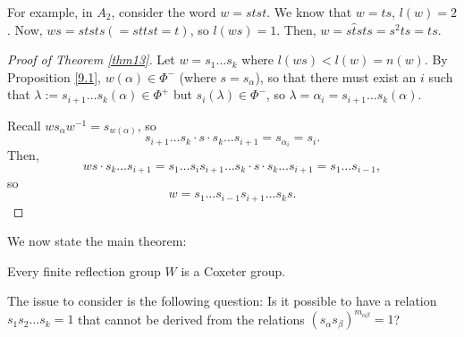 For example, in $A_2$, consider the word $w = stst$. We know that
$w = ts$, $l(w) = 2$. Now,
$ws = ststs (= sttst = t)$,
so $l(ws) = 1$. Then, $w = s \hat{t} sts = s^2 ts = ts$.

\begin{proof}[Proof of Theorem \ref{thm13}]
Let $w = s_1 \dots s_k$ where $l(ws) < l(w) = n(w)$. By Proposition \ref{9.1},
$w(\alpha) \in \Phi^-$ (where $s = s_\alpha$), so that there must exist an $i$
such that $\lambda := s_{i+1} \dots s_k(\alpha) \in \Phi^+$ but
$s_i(\lambda) \in \Phi^-$, so $\lambda = \alpha_i = s_{i+1} \dots s_k(\alpha)$.

Recall $w s_\alpha w^{-1} = s_{w(\alpha)}$, so
\[
    s_{i+1} \dots s_k \cdot s \cdot s_k \dots s_{i+1} = s_{\alpha_i} = s_i.
\]
Then,
\[
    w s \cdot s_k \dots s_{i+1}
    = s_1 \dots s_i s_{i+1} \dots s_k \cdot s \cdot s_k \dots s_{i+1}
    = s_1 \dots s_{i-1},
\]
so
\[
    w = s_1 \dots s_{i-1} s_{i+1} \dots s_k s.
\]
\end{proof}

We now state the main theorem:

\begin{theorem} \label{thm14}
Every finite reflection group $W$ is a Coxeter group.
\end{theorem}

The issue to consider is the following question: Is it possible to have a
relation $s_1 s_2 \dots s_k = 1$ that cannot be derived from the relations
$(s_\alpha s_\beta)^{m_{\alpha \beta}} = 1$?
